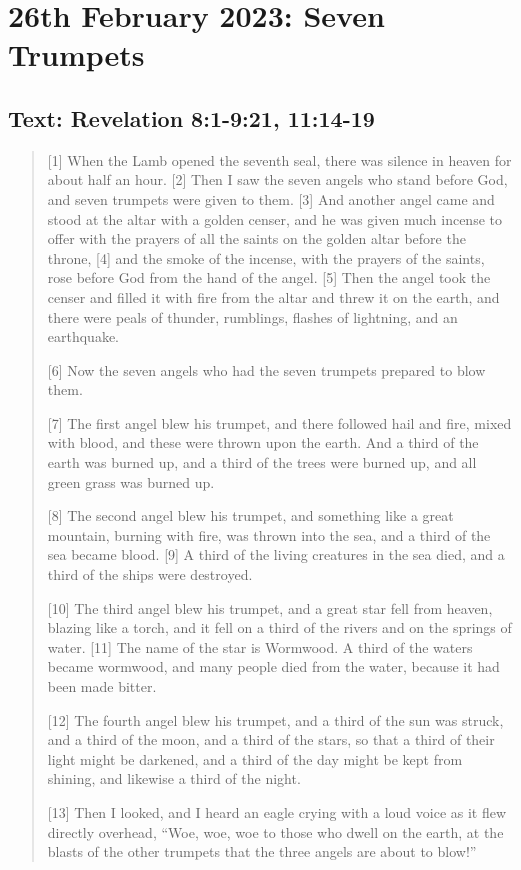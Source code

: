 \section{26th February 2023: Seven Trumpets}
\subsection*{Text: Revelation 8:1-9:21, 11:14-19}
  \begin{quote}
    [1] When the Lamb opened the seventh seal, there was silence in heaven for about half an hour. [2] Then I saw the seven angels who stand before God, and seven trumpets were given to them. [3] And another angel came and stood at the altar with a golden censer, and he was given much incense to offer with the prayers of all the saints on the golden altar before the throne, [4] and the smoke of the incense, with the prayers of the saints, rose before God from the hand of the angel. [5] Then the angel took the censer and filled it with fire from the altar and threw it on the earth, and there were peals of thunder, rumblings, flashes of lightning, and an earthquake.

    [6] Now the seven angels who had the seven trumpets prepared to blow them.

    [7] The first angel blew his trumpet, and there followed hail and fire, mixed with blood, and these were thrown upon the earth. And a third of the earth was burned up, and a third of the trees were burned up, and all green grass was burned up.

    [8] The second angel blew his trumpet, and something like a great mountain, burning with fire, was thrown into the sea, and a third of the sea became blood. [9] A third of the living creatures in the sea died, and a third of the ships were destroyed.

    [10] The third angel blew his trumpet, and a great star fell from heaven, blazing like a torch, and it fell on a third of the rivers and on the springs of water. [11] The name of the star is Wormwood. A third of the waters became wormwood, and many people died from the water, because it had been made bitter.

    [12] The fourth angel blew his trumpet, and a third of the sun was struck, and a third of the moon, and a third of the stars, so that a third of their light might be darkened, and a third of the day might be kept from shining, and likewise a third of the night.

    [13] Then I looked, and I heard an eagle crying with a loud voice as it flew directly overhead, “Woe, woe, woe to those who dwell on the earth, at the blasts of the other trumpets that the three angels are about to blow!”


\end{quote}
